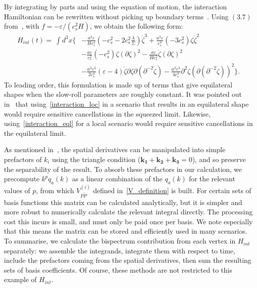 \documentclass[a4paper,12pt]{extarticle}
\newcommand{\Hint}{H_{int}}
\begin{document}
By integrating by parts and using the equation of motion,
the interaction Hamiltonian can be rewritten without
picking up boundary terms~\cite{rp_integ_by_parts}.
Using $(3.7)$ from~\cite{rp_integ_by_parts},
with $f=-\varepsilon/(c_s^2H)$,
we obtain the following form:
\begin{align}
    \Hint(t)=\ \int d^3x\bigg\{& -\frac{a^3\varepsilon}{H c_s^4}\left(-c_s^{2}-2c_s^{2}\frac{\lambda}{\Sigma}\right)\dot{\zeta}^3
		+ \frac{a^3\varepsilon}{c_s^{4}}\left(-3c_s^2\right) \zeta\dot{\zeta}^2\nonumber\\
		&- \frac{a\varepsilon}{c_s^{2}}\left(-c_s^2\right) \zeta(\partial\zeta)^2
        - \frac{a\varepsilon}{Hc_s^2}\dot{\zeta}(\partial\zeta)^2\nonumber\\
        &- \frac{a^3\varepsilon^2}{2c_s^{4}}(\varepsilon-4)\dot{\zeta}\partial\zeta\partial(\partial^{-2}\dot{\zeta})
        - \frac{a^3\varepsilon^3}{4c_s^4}\partial^2\zeta(\partial(\partial^{-2}\dot{\zeta}))^2\bigg\}.\label{interaction_eql}
\end{align}
To leading order, this formulation is made up of terms that
give equilateral shapes when the slow-roll parameters are roughly constant.
It was pointed out in~\cite{Funakoshi} that
using~\eqref{interaction_loc} in a scenario that results in an equilateral shape
would require sensitive cancellations in the squeezed limit.
Likewise, using~\eqref{interaction_eql} for a local scenario
would require sensitive cancellations in the equilateral limit.

As mentioned in~\cite{Funakoshi}, the spatial derivatives
can be manipulated into simple prefactors of $k_i$ using the
triangle condition ($\mathbf{k_1}+\mathbf{k_2}+\mathbf{k_3}=0$),
and so preserve the separability of the result.
To absorb these prefactors in our calculation, we precompute
$k^{p}q_a(k)$ as a linear combination of the $q_a(k)$ for the
relevant values of $p$,
from which $V^{(i)}_{P\tilde{P}}$ defined in~\eqref{V_definition} is built.
For certain sets of basis functions this matrix can be calculated analytically,
but it is simpler and more robust to numerically calculate the relevant integral directly.
The processing cost this incurs is small, and must only be
paid once per basis. We note especially that this means the matrix can
be stored and efficiently used in many scenarios.
To summarise,
we calculate the bispectrum contribution from each vertex in $\Hint$ separately:
we assemble the integrands, integrate them with respect to time,
include the prefactors coming from the spatial derivatives,
then sum the resulting sets of basis coefficients.
Of course, these methods are not restricted to this example of $\Hint$.
\end{document}
